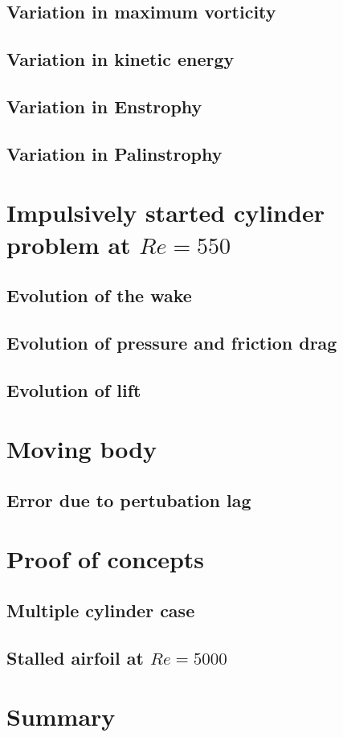 	\subsection{Variation in maximum vorticity}
	
	\subsection{Variation in kinetic energy}
	
	\subsection{Variation in Enstrophy}
	
	\subsection{Variation in Palinstrophy}

\section{Impulsively started cylinder problem at $Re=550$}

	\subsection{Evolution of the wake}
	
	\subsection{Evolution of pressure and friction drag}
	
	\subsection{Evolution of lift}

\section{Moving body}

	\subsection{Error due to pertubation lag}

\section{Proof of concepts}

	\subsection{Multiple cylinder case}
	
	\subsection{Stalled airfoil at $Re=5000$}

\section{Summary}
